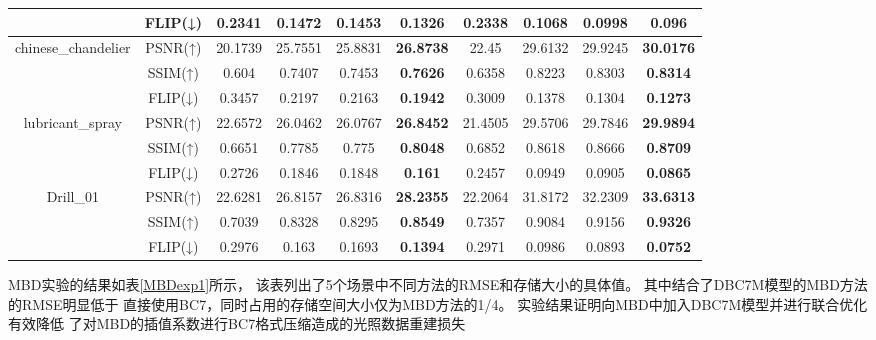 \begin{table*}[htbp]
{\begin{tabular}{cccccccccc}
                                         &FLIP(↓) & 0.2341 & 0.1472 & 0.1453 & \textbf{0.1326} & 0.2338 & 0.1068 & 0.0998 & \textbf{0.096} \\
    \midrule
    \multirow{3}{*}{chinese\_chandelier} &PSNR(↑) & 20.1739 & 25.7551 & 25.8831 & \textbf{26.8738} & 22.45 & 29.6132 & 29.9245 & \textbf{30.0176} \\
                                         &SSIM(↑) & 0.604 & 0.7407 & 0.7453 & \textbf{0.7626} & 0.6358 & 0.8223 & 0.8303 & \textbf{0.8314} \\
                                         &FLIP(↓) & 0.3457 & 0.2197 & 0.2163 & \textbf{0.1942} & 0.3009 & 0.1378 & 0.1304 & \textbf{0.1273} \\
    \midrule
    \multirow{3}{*}{lubricant\_spray}    &PSNR(↑) & 22.6572 & 26.0462 & 26.0767 & \textbf{26.8452} & 21.4505 & 29.5706 & 29.7846 & \textbf{29.9894} \\
                                         &SSIM(↑) & 0.6651 & 0.7785 & 0.775 & \textbf{0.8048} & 0.6852 & 0.8618 & 0.8666 & \textbf{0.8709} \\
                                         &FLIP(↓) & 0.2726 & 0.1846 & 0.1848 & \textbf{0.161} & 0.2457 & 0.0949 & 0.0905 & \textbf{0.0865} \\
    \midrule
    \multirow{3}{*}{Drill\_01}           &PSNR(↑) & 22.6281 & 26.8157 & 26.8316 & \textbf{28.2355} & 22.2064 & 31.8172 & 32.2309 & \textbf{33.6313} \\
                                         &SSIM(↑) & 0.7039 & 0.8328 & 0.8295 & \textbf{0.8549} & 0.7357 & 0.9084 & 0.9156 & \textbf{0.9326} \\
                                         &FLIP(↓) & 0.2976 & 0.163 & 0.1693 & \textbf{0.1394} & 0.2971 & 0.0986 & 0.0893 & \textbf{0.0752} \\
    \bottomrule
\end{tabular}

}   
\end{table*}

MBD实验的结果如表\ref{MBDexp1}所示，
该表列出了5个场景中不同方法的RMSE和存储大小的具体值。
其中结合了DBC7M模型的MBD方法的RMSE明显低于
直接使用BC7，同时占用的存储空间大小仅为MBD方法的1/4。
实验结果证明向MBD中加入DBC7M模型并进行联合优化有效降低
了对MBD的插值系数进行BC7格式压缩造成的光照数据重建损失

